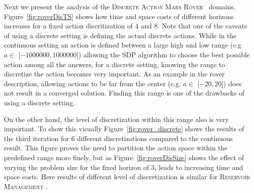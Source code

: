 \documentclass[twoside,11pt]{article}
\newcommand{\MarsRover}{\textsc{Mars Rover }}
\newcommand{\WaterReservoir}{\textsc{Reservoir Management }}
\begin{document}
Next we present the analysis of the \textsc{Discrete Action} \MarsRover\ domains. Figure~\ref{fig:roverDisTS} shows how time and space costs of different horizons increases for a fixed action discritization of 4 and 8.
Note that one of the caveats of using a discrete setting is defining the actual discrete actions. While in the continuous setting an action is defined between a large high and low range (e.g $a \in$ [$-1000000,1000000$]) allowing the SDP algorithm to choose the best possible action among all the answers, for a discrete setting, knowing the range to discretize the action becomes very important. As an example in the rover description, allowing actions to be far from the center (e.g. $a \in$ [$-20,20$]) does not result in a converged solution. Finding this range is one of the drawbacks of using a discrete setting. 

On the other hand, the level of discretization within this range also is very important. To show this visually Figure~\ref{fig:rover_discrete} shows the results of the third iteration for 6 different discretizations compared to the continuous result. This figure proves the need to partition the action space within the predefined range more finely, but as Figure~\ref{fig:roverDisSize} shows  the effect of varying the  problem size for the fixed horizon of 3, leads to increasing time and space costs. Here results of different level of discretization is similar for \WaterReservoir.
\end{document}
